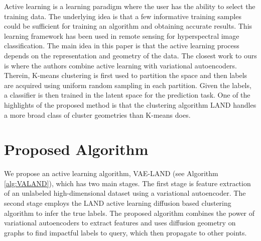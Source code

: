 \documentclass{article}
\begin{document}
Active learning is a learning paradigm where the user has the ability to select the training data\cite{cohn1995active,mackay1992information}.  The underlying idea is that a few informative training samples could be sufficient for training an algorithm and obtaining accurate results. This learning framework has been used in remote sensing for hyperspectral image classification\cite{liu2016active,wang2017novel,murphy2018iterative,tuia2009active}.  The main idea in this paper is that the active learning process depends on the representation and geometry of the data. The closest work to ours is  \cite{pourkamali2019effectiveness} where the authors combine active learning with variational autoencoders. Therein, K-means clustering is first used to partition the space and then labels are acquired using uniform random sampling in each partition. Given the labels, a classifier is then trained in the latent space for the prediction task. One of the highlights of the proposed method is that the clustering algorithm LAND handles a more broad class of cluster geometries than K-means does.

\section{Proposed Algorithm}
\label{sec:ProposedAlgorithm}
We propose an active learning algorithm, VAE-LAND (see Algorithm \ref{alg:VALAND}), which has two main stages. The first stage is feature extraction of an unlabeled high-dimensional dataset using a variational autoencoder. The second stage employs the LAND active learning diffusion based clustering algorithm to infer the true labels.  The proposed algorithm combines the power of variational autoencoders to extract features and uses diffusion geometry on graphs to find impactful labels to query, which then propagate to other points. 

\end{document}
